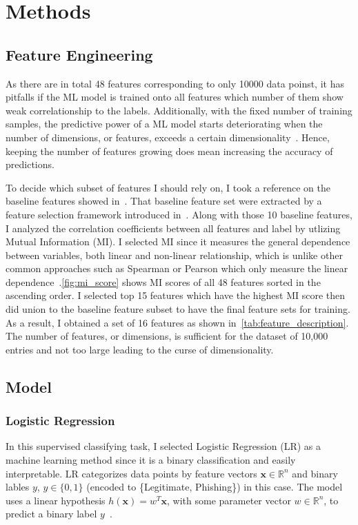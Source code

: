 \section{Methods}

\subsection{Feature Engineering}
As there are in total 48 features corresponding to only 10000 data poinst, it has pitfalls
if the ML model is trained onto all features which number of them show weak correlationship to
the labels. Additionally, with the fixed number of training samples, the predictive
power of a ML model starts deteriorating when the number of dimensions, or features, exceeds
a certain dimensionality~\cite{problem-dimension}. Hence, keeping the number of features growing
does mean increasing the accuracy of predictions.

To decide which subset of features I should rely on, I took a reference on the baseline features
showed in~\cite{CHIEW2019153}. That baseline feature set were extracted by a feature selection
framework introduced in~\cite{CHIEW2019153}. Along with those 10 baseline features, I analyzed
the correlation coefficients between all features and label by utlizing Mutual Information (MI).
I selected MI since it measures the general dependence between variables, both linear and non-linear
relationship, which is unlike other common approaches such as Spearman or Pearson which only measure
the linear dependence~\cite{MI-score}.\autoref{fig:mi_score} shows MI scores of all 48 features
sorted in the ascending order. I selected top 15 features which have the highest MI score then did
union to the baseline feature subset to have the final feature sets for training. As a result,
I obtained a set of 16 features as shown in~\autoref{tab:feature_description}. The number of
features, or dimensions, is sufficient for the dataset of 10,000 entries and not too large leading
to the curse of dimensionality.


\subsection{Model}
\subsubsection{Logistic Regression}
In this supervised classifying task, I selected Logistic Regression (LR) as a machine learning method since it
is a binary classification and easily interpretable. LR categorizes data points by feature vectors
$\mathbf{x} \in \mathbb{R}^n$ and binary lables $y$, $y \in \{0,1\}$ (encoded to \{Legitimate, Phishing\}) in this case.
The model uses a linear hypothesis $h(\mathbf{x}) = w^T\mathbf{x}$, with some parameter vector $w \in \mathbb{R}^n$,
to predict a binary label $y$~\cite{ml-book}.

